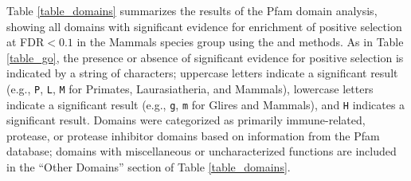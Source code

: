 Table \ref{table_domains} summarizes the results of the Pfam domain
analysis, showing all domains with significant evidence for enrichment
of positive selection at FDR$<0.1$ in the Mammals species group using
the \psgeone and \psgefive methods. As in Table \ref{table_go}, the
presence or absence of significant evidence for positive selection is
indicated by a string of characters; uppercase letters indicate a
significant \psgeone result (e.g., \texttt{P}, \texttt{L}, \texttt{M}
for Primates, Laurasiatheria, and Mammals), lowercase letters indicate
a significant \psgefive result (e.g., \texttt{g}, \texttt{m} for
Glires and Mammals), and \texttt{H} indicates a significant \psghoch
result. Domains were categorized as primarily immune-related,
protease, or protease inhibitor domains based on information from the
Pfam database; domains with miscellaneous or uncharacterized functions
are included in the ``Other Domains'' section of Table
\ref{table_domains}.

